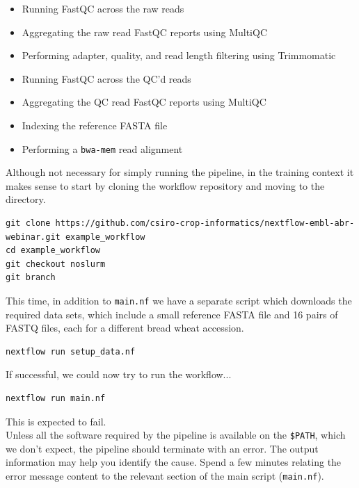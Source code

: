 \begin{itemize}
  \item Running FastQC across the raw reads
  \item Aggregating the raw read FastQC reports using MultiQC
  \item Performing adapter, quality, and read length filtering using Trimmomatic
  \item Running FastQC across the QC'd reads
  \item Aggregating the QC read FastQC reports using MultiQC
  \item Indexing the reference FASTA file
  \item Performing a \texttt{bwa-mem} read alignment
\end{itemize}


\begin{steps}
Although not necessary for simply running the pipeline, in the training context it makes sense to start by cloning the workflow repository and moving to the directory.

\begin{lstlisting}
git clone https://github.com/csiro-crop-informatics/nextflow-embl-abr-webinar.git example_workflow
cd example_workflow
git checkout noslurm
git branch
\end{lstlisting}

This time, in addition to \texttt{main.nf} we have a separate script which downloads the required data sets, which include a small reference FASTA file and 16 pairs of FASTQ files, each for a different bread wheat accession.


\begin{lstlisting}
nextflow run setup_data.nf
\end{lstlisting}


If successful, we could now try to run the workflow...

\begin{lstlisting}
nextflow run main.nf
\end{lstlisting}

\begin{warning}
This is expected to fail.\\
Unless all the software required by the pipeline is available on the \texttt{\$PATH},
which we don't expect, the pipeline should terminate with an error.
The output information may help you identify the cause. 
Spend a few minutes relating the error message content to the relevant section of the main script (\texttt{main.nf}). 
\end{warning}




\end{steps}

